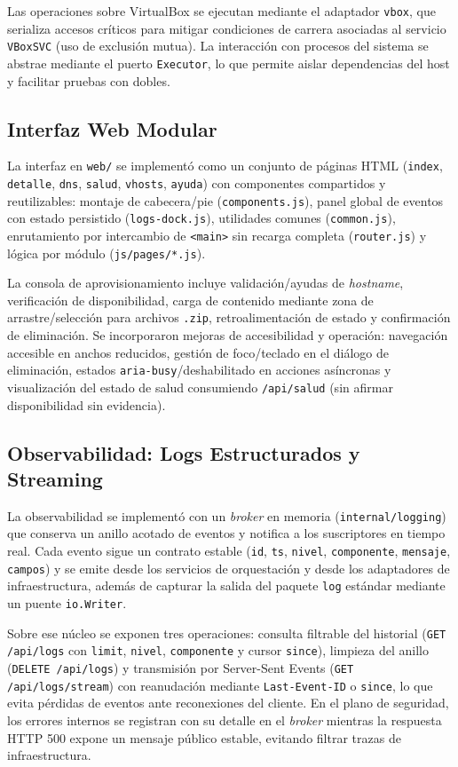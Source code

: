 Las operaciones sobre VirtualBox se ejecutan mediante el adaptador \texttt{vbox}, que serializa accesos críticos para mitigar condiciones de carrera asociadas al servicio \texttt{VBoxSVC} (uso de exclusión mutua). La interacción con procesos del sistema se abstrae mediante el puerto \texttt{Executor}, lo que permite aislar dependencias del host y facilitar pruebas con dobles.

\subsection{Interfaz Web Modular}
La interfaz en \texttt{web/} se implementó como un conjunto de páginas HTML (\texttt{index}, \texttt{detalle}, \texttt{dns}, \texttt{salud}, \texttt{vhosts}, \texttt{ayuda}) con componentes compartidos y reutilizables: montaje de cabecera/pie (\texttt{components.js}), panel global de eventos con estado persistido (\texttt{logs-dock.js}), utilidades comunes (\texttt{common.js}), enrutamiento por intercambio de \texttt{<main>} sin recarga completa (\texttt{router.js}) y lógica por módulo (\texttt{js/pages/*.js}).

La consola de aprovisionamiento incluye validación/ayudas de \textit{hostname}, verificación de disponibilidad, carga de contenido mediante zona de arrastre/selección para archivos \texttt{.zip}, retroalimentación de estado y confirmación de eliminación. Se incorporaron mejoras de accesibilidad y operación: navegación accesible en anchos reducidos, gestión de foco/teclado en el diálogo de eliminación, estados \texttt{aria-busy}/deshabilitado en acciones asíncronas y visualización del estado de salud consumiendo \texttt{/api/salud} (sin afirmar disponibilidad sin evidencia).

\subsection{Observabilidad: Logs Estructurados y Streaming}
La observabilidad se implementó con un \textit{broker} en memoria (\texttt{internal/logging}) que conserva un anillo acotado de eventos y notifica a los suscriptores en tiempo real. Cada evento sigue un contrato estable (\texttt{id}, \texttt{ts}, \texttt{nivel}, \texttt{componente}, \texttt{mensaje}, \texttt{campos}) y se emite desde los servicios de orquestación y desde los adaptadores de infraestructura, además de capturar la salida del paquete \texttt{log} estándar mediante un puente \texttt{io.Writer}.

Sobre ese núcleo se exponen tres operaciones: consulta filtrable del historial (\texttt{GET /api/logs} con \texttt{limit}, \texttt{nivel}, \texttt{componente} y cursor \texttt{since}), limpieza del anillo (\texttt{DELETE /api/logs}) y transmisión por Server-Sent Events (\texttt{GET /api/logs/stream}) con reanudación mediante \texttt{Last-Event-ID} o \texttt{since}, lo que evita pérdidas de eventos ante reconexiones del cliente. En el plano de seguridad, los errores internos se registran con su detalle en el \textit{broker} mientras la respuesta HTTP 500 expone un mensaje público estable, evitando filtrar trazas de infraestructura.


